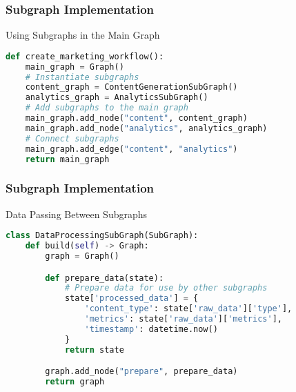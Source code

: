\begin{frame}[fragile]\frametitle{Subgraph Implementation}

Using Subgraphs in the Main Graph

\begin{lstlisting}[language=Python, basicstyle=\tiny]
def create_marketing_workflow():
    main_graph = Graph()
    # Instantiate subgraphs
    content_graph = ContentGenerationSubGraph()
    analytics_graph = AnalyticsSubGraph()
    # Add subgraphs to the main graph
    main_graph.add_node("content", content_graph)
    main_graph.add_node("analytics", analytics_graph)
    # Connect subgraphs
    main_graph.add_edge("content", "analytics")
    return main_graph
\end{lstlisting}
\end{frame}

\begin{frame}[fragile]\frametitle{Subgraph Implementation}

Data Passing Between Subgraphs

\begin{lstlisting}[language=Python, basicstyle=\tiny]
class DataProcessingSubGraph(SubGraph):
    def build(self) -> Graph:
        graph = Graph()

        def prepare_data(state):
            # Prepare data for use by other subgraphs
            state['processed_data'] = {
                'content_type': state['raw_data']['type'],
                'metrics': state['raw_data']['metrics'],
                'timestamp': datetime.now()
            }
            return state

        graph.add_node("prepare", prepare_data)
        return graph
\end{lstlisting}
\end{frame}

